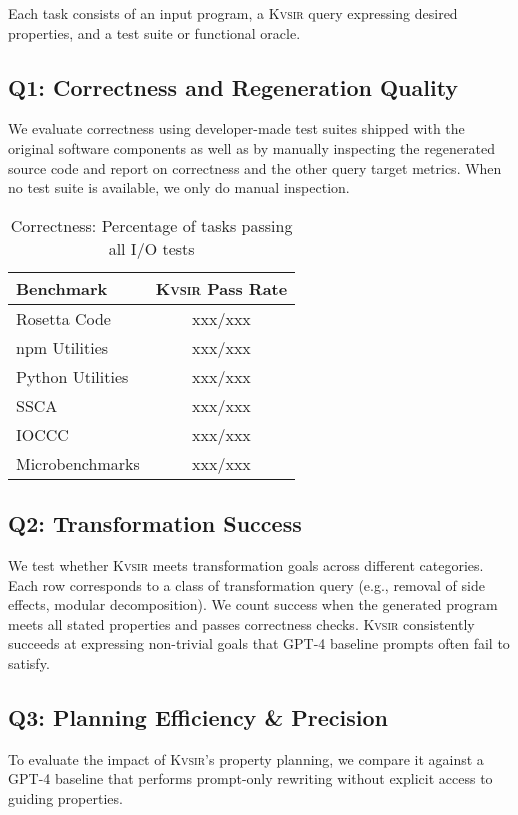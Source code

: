 \documentclass[sigplan]{acmart}
\newcommand{\sys}{{\scshape Kv{\textalpha}sir}\xspace}
\newcommand{\xxx}{\colorbox{red!30}{xxx}\xspace}
\begin{document}
Each task consists of an input program, a \sys query expressing desired properties, and a test suite or functional oracle.

\subsection{Q1: Correctness and Regeneration Quality}

We evaluate correctness using developer-made test suites 
shipped with the original software components as well as by manually inspecting
the regenerated source code and report on correctness and the other query target metrics.
When no test suite is available, we only do manual inspection.

\begin{table}[h]
  \centering
  \caption{Correctness: Percentage of tasks passing all I/O tests}
  \begin{tabular}{lc}
    \toprule
    Benchmark & \sys Pass Rate \\ 
    \midrule
    Rosetta Code & \xxx/\xxx  \\
    npm Utilities & \xxx/\xxx \\
    Python Utilities & \xxx/\xxx \\
    SSCA & \xxx/\xxx  \\
    IOCCC & \xxx/\xxx  \\
    Microbenchmarks & \xxx/\xxx  \\
    \bottomrule
  \end{tabular}
\end{table}

\subsection{Q2: Transformation Success}

We test whether \sys meets transformation goals across different categories.
Each row corresponds to a class of transformation query (e.g., removal of side effects, modular decomposition).
We count success when the generated program meets all stated properties and passes correctness checks.
\sys consistently succeeds at expressing non-trivial goals that GPT-4 baseline prompts often fail to satisfy.

\subsection{Q3: Planning Efficiency \& Precision}

To evaluate the impact of \sys's property planning, we compare it against a GPT-4 baseline that performs prompt-only rewriting without explicit access to guiding properties.
\end{document}
